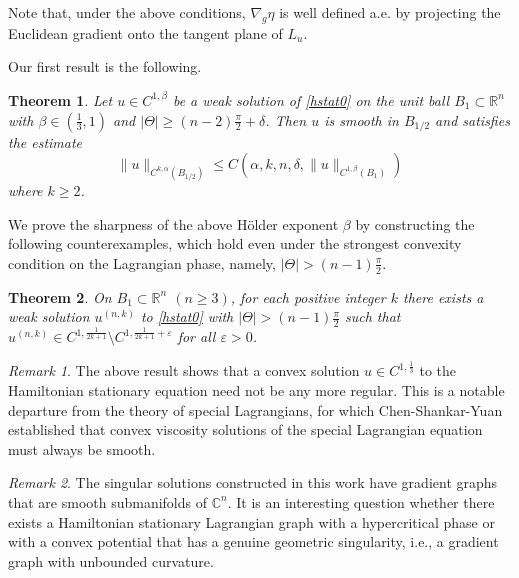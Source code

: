 \documentclass[12pt,reqno]{amsart}%
\newtheorem{theorem}{Theorem}[section]
\theoremstyle{plain}
\numberwithin{equation}{section}
\theoremstyle{definition}
\theoremstyle{remark}
\newtheorem{remark}{Remark}[section]
\newcommand{\R}{\mathbb{R}}
\begin{document}
Note that, under the above conditions, $\nabla_g \eta$ is well defined a.e. by projecting the Euclidean gradient onto the tangent plane of $L_u$.


\medskip
Our first result is the following.



\begin{theorem} \label{Thm_reg_holder}
Let $u\in C^{1, \beta}$ be a weak solution of \eqref{hstat0} on the unit ball $B_1\subset \mathbb{R}^n$  with $\beta \in ( \frac13,1) $ and $|\Theta| \geq (n-2)\frac{\pi}{2}+\delta$. Then $u$
is smooth in $B_{1/2}$ and satisfies the estimate
    \begin{equation*}
        \|u\|_{C^{k, \alpha}(B_{1/2})}\leq C(\alpha,k,  n,  \delta, \|u\|_{C^{1, \beta}(B_{1})} ) 
        \end{equation*} where $k\geq 2$.
\end{theorem}








We prove the sharpness of the above Hölder exponent $\beta$ by constructing the following counterexamples, which hold even under the strongest convexity condition on the Lagrangian phase, namely, $|\Theta|>(n-1)\frac{\pi}{2}$.


\begin{theorem}\label{Thm_sing_soln} On $B_1 \subset \R^n$ $(n \geq 3)$, for each positive integer $k$ there exists a weak solution $u^{(n,k)}$ to \eqref{hstat0} with $|\Theta|> (n-1) \frac \pi 2$
such that
$u^{(n,k)} \in  C^{1, \frac 1{2k+1}} \setminus C^{1,\frac1{2k+1} + \varepsilon }$ for all $\varepsilon >0$. 
\end{theorem} 


\begin{remark}
    The above result shows that a convex solution $u\in C^{1, \frac{1}{3}}$ to the Hamiltonian stationary equation need not be any more regular. This is a notable departure from the theory of special Lagrangians, for which Chen-Shankar-Yuan \cite{CSY} established that convex viscosity solutions of the special Lagrangian equation must always be smooth. 
\end{remark}





\begin{remark}
    The singular solutions constructed in this work have gradient graphs that are smooth submanifolds of $\mathbb{C}^n$. It is an interesting question whether there exists a Hamiltonian stationary Lagrangian graph with a hypercritical phase or with a convex potential that has a genuine geometric singularity, i.e., a gradient graph with unbounded curvature. 
\end{remark}
\end{document}
